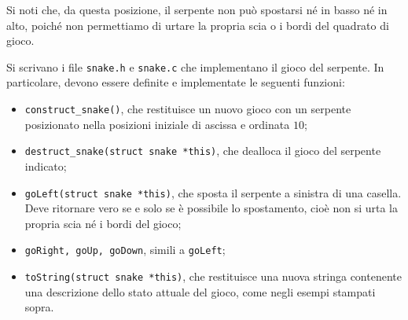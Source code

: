 \documentclass{article}[10pt]
\newcounter{esnu}
\newenvironment{esercizio}{\medskip \noindent {\bf Esercizio\addtocounter{esnu}{1} \arabic{esnu}}}{}
\begin{document}
\begin{esercizio}
\noindent
Si noti che, da questa posizione, il serpente non pu\`o spostarsi n\'e in basso
n\'e in alto, poich\'e
non permettiamo di urtare la propria scia o i bordi del quadrato di gioco.

Si scrivano i file \texttt{snake.h} e \texttt{snake.c} che implementano il gioco del serpente.
In particolare, devono essere definite e implementate le seguenti funzioni:
%
\begin{itemize}
\item \texttt{construct\_snake()}, che restituisce un nuovo gioco con un serpente
      posizionato nella posizioni iniziale di ascissa e ordinata $10$;
\item \texttt{destruct\_snake(struct snake *this)}, che dealloca il gioco del serpente indicato;
\item \texttt{goLeft(struct snake *this)}, che sposta il serpente a sinistra di una casella.
      Deve ritornare vero se e solo se \`e possibile lo spostamento, cio\`e non si
      urta la propria scia n\'e i bordi del gioco;
\item \texttt{goRight, goUp, goDown}, simili a \texttt{goLeft};
\item \texttt{toString(struct snake *this)}, che restituisce una nuova stringa
      contenente una descrizione dello stato attuale del gioco, come negli esempi
      stampati sopra.
\end{itemize}
%
\end{esercizio}
%
\end{document}
